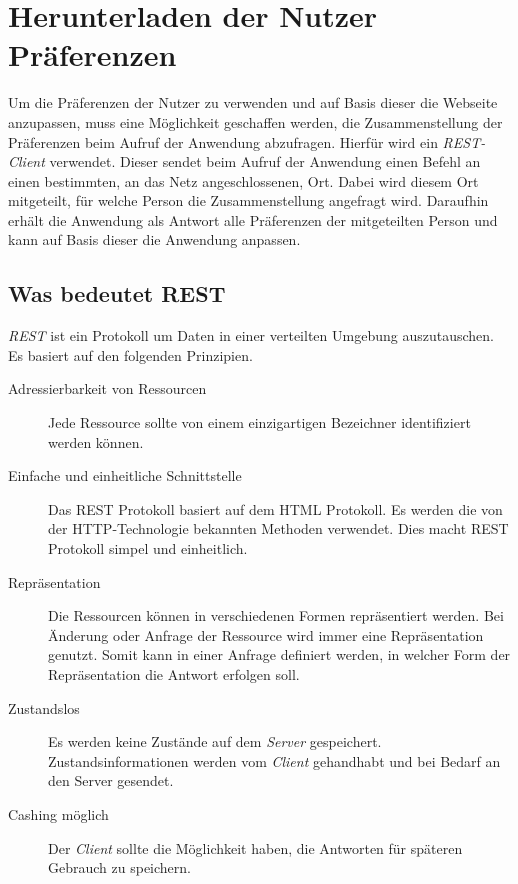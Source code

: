 \documentclass[12pt, paper=a4, bibtotoc, toc=listof, headsepline=true]{scrreprt}
\begin{document}
\section{Herunterladen der Nutzer Präferenzen}
Um die Präferenzen der Nutzer zu verwenden und auf Basis dieser die Webseite anzupassen, muss eine Möglichkeit geschaffen werden, die Zusammenstellung der Präferenzen beim Aufruf der Anwendung abzufragen. Hierfür wird ein \emph{REST-Client} verwendet. Dieser sendet beim Aufruf der Anwendung einen Befehl an einen bestimmten, an das Netz angeschlossenen, Ort. Dabei wird diesem Ort mitgeteilt, für welche Person die Zusammenstellung angefragt wird. Daraufhin erhält die Anwendung als Antwort alle Präferenzen der mitgeteilten Person und kann auf Basis dieser die Anwendung anpassen.
\subsection{Was bedeutet REST}
\emph{\ac{REST}} ist ein Protokoll um Daten in einer verteilten Umgebung auszutauschen. Es basiert auf den folgenden Prinzipien\cite[S.77]{chauhan2014asp}.
\begin{description}  
	\item  [Adressierbarkeit von Ressourcen]
	Jede Ressource sollte von einem einzigartigen Bezeichner identifiziert werden können.
	
	\item [Einfache und einheitliche Schnittstelle]
	Das \ac{REST} Protokoll basiert auf dem \ac{HTML} Protokoll. Es werden die von der \ac{HTTP}-Technologie bekannten Methoden verwendet. Dies macht \ac{REST} Protokoll 
	simpel und einheitlich.
	
	\item  [Repräsentation] 
	Die Ressourcen können in verschiedenen Formen repräsentiert werden. Bei Änderung oder Anfrage der Ressource wird immer eine Repräsentation genutzt. Somit kann in einer Anfrage definiert werden, in welcher Form der Repräsentation die Antwort erfolgen soll.
	
	\item [Zustandslos]
	Es werden keine Zustände auf dem \emph{Server} gespeichert. Zustandsinformationen werden vom \emph{Client} gehandhabt und bei Bedarf an den Server gesendet.
	
	\item [Cashing möglich]
	Der \emph{Client} sollte die Möglichkeit haben,  die Antworten für späteren Gebrauch zu speichern.	
\end{description}
\end{document}
